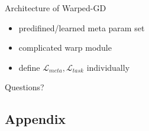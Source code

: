 \documentclass{beamer}
\begin{document}
\begin{frame}{Architecture of Warped-GD}
  \begin{itemize}
    \item predifined/learned meta param set
    \item complicated warp module
    \item define $\mathcal{L}_{meta}, \mathcal{L}_{task}$ individually
  \end{itemize}
\end{frame}

\begin{frame}
	\begin{center}
    \LARGE{Questions?}
	\end{center}
\end{frame}


\subsection{Appendix}
\end{document}
